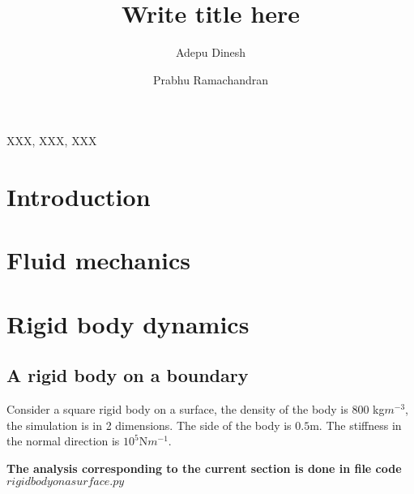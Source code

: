 \documentclass[preprint,12pt]{elsarticle}
\begin{document}
\begin{frontmatter}

  \title{Write title here}
  \author[IITB]{Adepu Dinesh }
   \author[IITB]{Prabhu Ramachandran}
   \address[IITB]{Department of Aerospace
    Engineering, Indian Institute of Technology Bombay, Powai, Mumbai 400076}


\begin{abstract}
\end{abstract}

\begin{keyword}
{XXX}, {XXX}, {XXX}


\end{keyword}

\end{frontmatter}


\section{Introduction}
\label{sec:intro}



\section{Fluid mechanics}
\label{sec:fluid-mechanics}



\section{Rigid body dynamics}
\label{sec:rbd-dynamics}

\subsection{A rigid body on a boundary}

Consider a square rigid body on a surface, the density of the body is 800
kg$m^{-3}$, the simulation is in 2 dimensions. The side of the body is
$0.5$m. The stiffness in the normal direction is $10^5$N$m^{-1}$.

\textbf{The analysis corresponding to the current section is done in file
  code $rigidbodyonasurface.py$}
\end{document}
